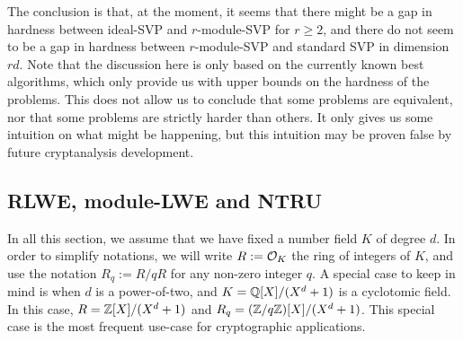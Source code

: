 The conclusion is that, at the moment, it seems that there might be a gap in hardness between ideal-SVP and $r$-module-SVP for $r \geq 2$, and there do not seem to be a gap in hardness between $r$-module-SVP and standard SVP in dimension $rd$. Note that the discussion here is only based on the currently known best algorithms, which only provide us with upper bounds on the hardness of the problems. This does not allow us to conclude that some problems are equivalent, nor that some problems are strictly harder than others. It only gives us some intuition on what might be happening, but this intuition may be proven false by future cryptanalysis development.







\subsection{RLWE, module-LWE and NTRU}
\label{sec:rlwe-mlwe-ntru}
In all this section, we assume that we have fixed a number field $K$ of degree $d$. In order to simplify notations, we will write $R := \mathcal{O}_K$ the ring of integers of $K$, and use the notation $R_q := R/qR$ for any non-zero integer $q$. A special case to keep in mind is when $d$ is a power-of-two, and $K = \mathbb{Q}[X]/(X^d+1)$ is a cyclotomic field. In this case, $R = \mathbb{Z}[X]/(X^d+1)$ and $R_q = (\mathbb{Z}/q\mathbb{Z})[X]/(X^d+1)$. This special case is the most frequent use-case for cryptographic applications.

